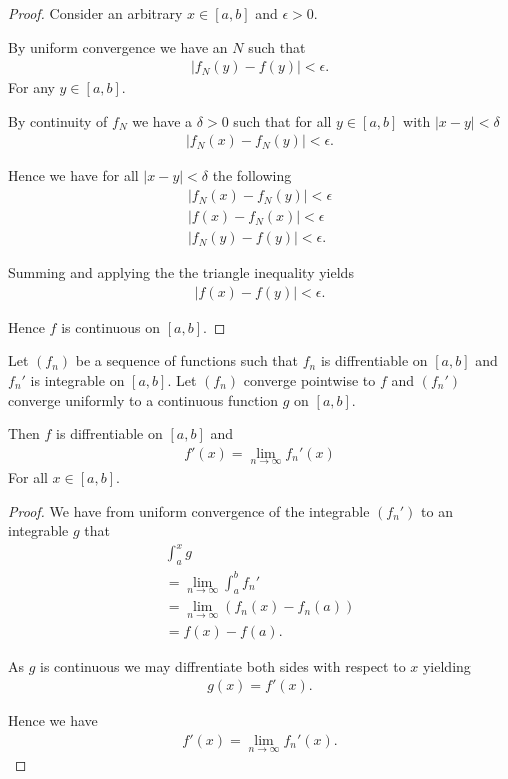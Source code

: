 \documentclass[]{article}
\begin{document}
\begin{proof}
		Consider an arbitrary $x \in [a,b]$ and $\epsilon > 0$. 

		By uniform convergence we have an $N$ such that
		\begin{align*}
				|f_N(y) - f(y)| < \epsilon.
		\end{align*}
		For any $y \in [a,b]$.

		By continuity of $f_N$ we have a $\delta > 0$ such that for all $y \in [a,b]$ with $|x-y| < \delta$ 
		\begin{align*}
				|f_N(x) - f_N(y)| < \epsilon.	
		\end{align*}

		Hence we have for all $|x-y| < \delta$ the following
		\begin{align*}
				|f_N(x) - f_N(y)| < \epsilon \\
				|f(x) - f_N(x)| < \epsilon \\
				|f_N(y) - f(y)| < \epsilon.
		\end{align*}

		Summing and applying the the triangle inequality yields
		\begin{align*}
				|f(x) - f(y)| < \epsilon.	
		\end{align*}

		Hence $f$ is continuous on $[a,b]$.
\end{proof}

\begin{thm}
		Let $(f_n)$ be a sequence of functions such that $f_n$ is diffrentiable on $[a,b]$ and $f_n'$ is integrable on $[a,b]$. Let $(f_n)$ converge pointwise to $f$ and $(f_n')$  converge uniformly to a continuous function $g$ on $[a,b]$.

		Then $f$ is diffrentiable on $[a,b]$ and 
		\begin{align*}
				f'(x) = \lim_{n \to \infty} f_n'(x)
		\end{align*}
		For all $x \in [a,b]$.
\end{thm}

\begin{proof}
		We have from uniform convergence of the integrable $(f_n')$ to an integrable $g$ that
		\begin{align*}
			\int_a^xg  \\
			= \lim_{n \to \infty} \int_a^b f_n' \\				
			= \lim_{n \to \infty} (f_n(x) - f_n(a)) \\
			= f(x) - f(a).
		\end{align*}

		As $g$ is continuous we may diffrentiate both sides with respect to $x$ yielding
		\begin{align*}
				g(x) = f'(x).
		\end{align*}

		Hence we have
		\begin{align*}
				f'(x) = \lim_{n \to \infty} f_n'(x).
		\end{align*}
\end{proof}
\end{document}
